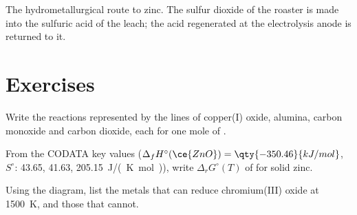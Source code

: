 \begin{omfigure}

{\small The hydrometallurgical route to zinc. The sulfur dioxide of the roaster
is made into the sulfuric acid of the leach; the acid regenerated at the
electrolysis anode is returned to it.}
\end{omfigure}

\section{Exercises}

\begin{exercise}[$\star$]\label{exo:b2:ellingham:1}
Write the reactions represented by the lines of copper(I) oxide, alumina, carbon
monoxide and carbon dioxide, each for one mole of .
\end{exercise}

\begin{exercise}[$\star$]\label{exo:b2:ellingham:2}
From the CODATA key values ($\Delta_f H^\circ(\ce{ZnO}) = \qty{-350.46}{kJ/mol}$,
$S^\circ$:  43.65,  41.63,  \qty{205.15}{J/(K.mol)}),
write $\Delta_r G^\circ(T)$ of  for solid zinc.
\end{exercise}

\begin{exercise}[$\star$]\label{exo:b2:ellingham:3}
Using the diagram, list the metals that can reduce chromium(III) oxide at
\qty{1500}{K}, and those that cannot.
\end{exercise}

